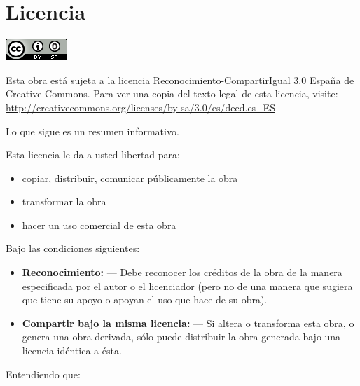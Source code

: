 \section*{Licencia}

\includegraphics{ccbysa-88x31.png}

Esta obra está sujeta a la licencia Reconocimiento-CompartirIgual 3.0 España de Creative Commons.
Para ver una copia del texto legal de esta licencia, visite: \newline
\href{http://creativecommons.org/licenses/by-sa/3.0/es/deed.es\_ES}{http://creativecommons.org/licenses/by-sa/3.0/es/deed.es\_ES}

Lo que sigue es un resumen informativo.

Esta licencia le da a usted libertad para:
\begin{itemize}
\itemsep1pt\parskip0pt
\item copiar, distribuir, comunicar públicamente la obra
\item transformar la obra
\item hacer un uso comercial de esta obra
\end{itemize}

Bajo las condiciones siguientes:

\begin{itemize}
\itemsep1pt\parskip0pt
\item
{\bf Reconocimiento:} —
Debe reconocer los créditos de la obra de la manera especificada por el autor o el licenciador (pero no de una manera que sugiera que tiene su apoyo o apoyan el uso que hace de su obra).
\item
{\bf Compartir bajo la misma licencia:} —
Si altera o transforma esta obra, o genera una obra derivada, sólo puede distribuir la obra generada bajo una licencia idéntica a ésta.
\end{itemize}

Entendiendo que:

